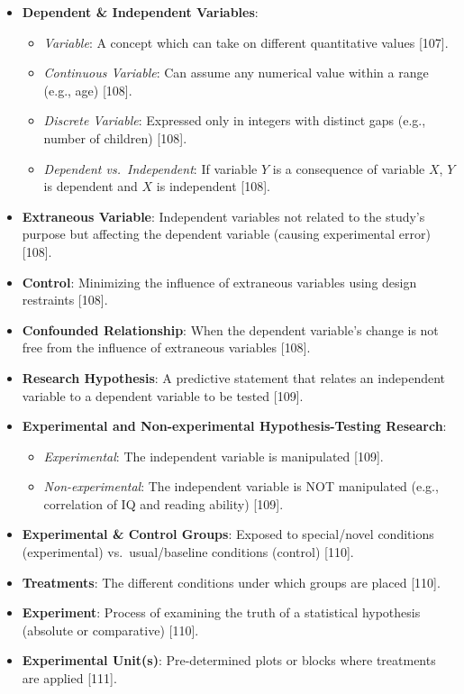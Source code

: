 \documentclass[
]{article}
\providecommand{\tightlist}{%
  \setlength{\itemsep}{0pt}\setlength{\parskip}{0pt}}
\begin{document}
\begin{itemize}
\tightlist
\item
  \textbf{Dependent \& Independent Variables}:

  \begin{itemize}
  \tightlist
  \item
    \emph{Variable}: A concept which can take on different quantitative
    values {[}107{]}.
  \item
    \emph{Continuous Variable}: Can assume any numerical value within a
    range (e.g., age) {[}108{]}.
  \item
    \emph{Discrete Variable}: Expressed only in integers with distinct
    gaps (e.g., number of children) {[}108{]}.
  \item
    \emph{Dependent vs.~Independent}: If variable \(Y\) is a consequence
    of variable \(X\), \(Y\) is dependent and \(X\) is independent
    {[}108{]}.
  \end{itemize}
\item
  \textbf{Extraneous Variable}: Independent variables not related to the
  study's purpose but affecting the dependent variable (causing
  experimental error) {[}108{]}.
\item
  \textbf{Control}: Minimizing the influence of extraneous variables
  using design restraints {[}108{]}.
\item
  \textbf{Confounded Relationship}: When the dependent variable's change
  is not free from the influence of extraneous variables {[}108{]}.
\item
  \textbf{Research Hypothesis}: A predictive statement that relates an
  independent variable to a dependent variable to be tested {[}109{]}.
\item
  \textbf{Experimental and Non-experimental Hypothesis-Testing
  Research}:

  \begin{itemize}
  \tightlist
  \item
    \emph{Experimental}: The independent variable is manipulated
    {[}109{]}.
  \item
    \emph{Non-experimental}: The independent variable is NOT manipulated
    (e.g., correlation of IQ and reading ability) {[}109{]}.
  \end{itemize}
\item
  \textbf{Experimental \& Control Groups}: Exposed to special/novel
  conditions (experimental) vs.~usual/baseline conditions (control)
  {[}110{]}.
\item
  \textbf{Treatments}: The different conditions under which groups are
  placed {[}110{]}.
\item
  \textbf{Experiment}: Process of examining the truth of a statistical
  hypothesis (absolute or comparative) {[}110{]}.
\item
  \textbf{Experimental Unit(s)}: Pre-determined plots or blocks where
  treatments are applied {[}111{]}.
\end{itemize}
\end{document}
